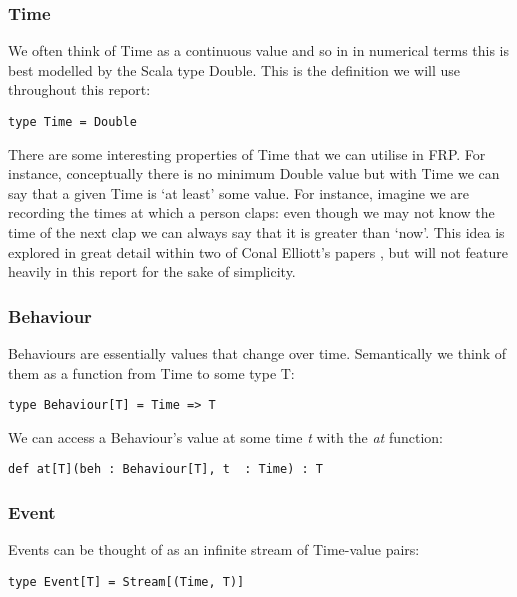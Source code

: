       \subsubsection{Time}
        We often think of
        Time as a continuous value and so in in numerical terms this is best modelled by the
        Scala type Double. This is the definition we will use throughout this report:

\begin{verbatim}
type Time = Double
\end{verbatim}    

        There are some interesting properties of Time that we can utilise in FRP. For instance,
        conceptually there is no minimum Double value but with Time we can say that a given Time is `at least'
        some value. For instance, imagine we are recording the times at which a person claps: even though we
        may not know the time of the next clap we can always say that it is greater than `now'. This idea is explored 
        in great detail within two of Conal Elliott's papers \cite{Elliott1997}, \cite{Elliott2009} but will not feature
        heavily in this report for the sake of simplicity.
   
      \subsubsection{Behaviour}
        Behaviours are essentially values that change over time. Semantically we think of them as
        a function from Time to some type T:

\begin{verbatim}
type Behaviour[T] = Time => T
\end{verbatim}
        
        We can access a Behaviour's value at some time \emph{t} with the \emph{at} function:

\begin{verbatim}
def at[T](beh : Behaviour[T], t  : Time) : T
\end{verbatim}
      
      \subsubsection{Event}
        Events can be thought of as an infinite stream of Time-value pairs:

\begin{verbatim}
type Event[T] = Stream[(Time, T)]
\end{verbatim}
        
